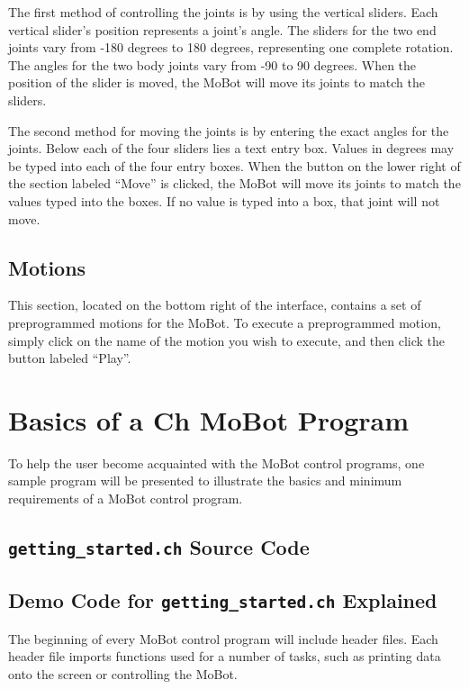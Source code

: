 \documentclass{article}
\begin{document}
The first method of controlling the joints is by using the vertical sliders.
Each vertical slider's position represents a joint's angle. The sliders for the
two end joints vary from -180 degrees to 180 degrees, representing one complete
rotation. The angles for the two body joints vary from -90 to 90 degrees. When
the position of the slider is moved, the MoBot will move its joints to match the 
sliders. 

The second method for moving the joints is by entering the exact angles for the
joints. Below each of the four sliders lies a text entry box. Values in degrees
may be typed into each of the four entry boxes. When the button on the lower
right of the section labeled ``Move'' is clicked, the MoBot will move its joints
to match the values typed into the boxes. If no value is typed into a box, that 
joint will not move.

\subsection{Motions}
This section, located on the bottom right of the interface, contains a set of
preprogrammed motions for the MoBot. To execute a preprogrammed motion, simply
click on the name of the motion you wish to execute, and then click the button
labeled ``Play''.

\section{Basics of a Ch MoBot Program}
To help the user become acquainted with the MoBot control programs, one sample
program will be presented to illustrate the basics and minimum requirements of
a MoBot control program. 

\subsection{\texttt{getting\_started.ch} Source Code}


\subsection{\label{sec:democode}Demo Code for \texttt{getting\_started.ch} Explained}
The beginning of every MoBot control program will include header files. Each
header file imports functions used for a number of tasks, such as printing
data onto the screen or controlling the MoBot. 
\end{document}
